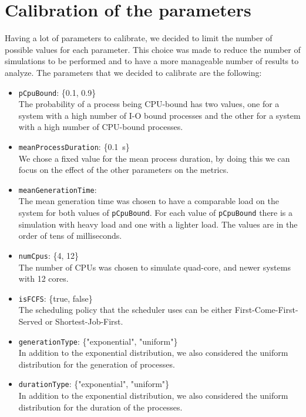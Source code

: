 
\section{Calibration of the parameters}

Having a lot of parameters to calibrate, we decided to limit the number of possible values for each parameter. This choice was made to reduce the number of simulations to be performed and to have a more manageable number of results to analyze. The parameters that we decided to calibrate are the following:

\begin{itemize}
    \item \texttt{pCpuBound}: \{0.1, 0.9\} \\
          The probability of a process being CPU-bound has two values, one for a system with a high number of I-O bound processes and the other for a system with a high number of CPU-bound processes.
    \item \texttt{meanProcessDuration}: \{\SI{0.1}{\second}\} \\
          We chose a fixed value for the mean process duration, by doing this we can focus on the effect of the other parameters on the metrics.
    \item \texttt{meanGenerationTime}:\\
          The mean generation time was chosen to have a comparable load on the system for both values of \texttt{pCpuBound}. For each value of \texttt{pCpuBound} there is a simulation with heavy load and one with a lighter load. The values are in the order of tens of milliseconds.
    \item \texttt{numCpus}: \{4, 12\} \\
          The number of CPUs was chosen to simulate quad-core, and newer systems with 12 cores.
    \item \texttt{isFCFS}: \{true, false\} \\
          The scheduling policy that the scheduler uses can be either First-Come-First-Served or Shortest-Job-First.
    \item \texttt{generationType}: \{"exponential", "uniform"\} \\
          In addition to the exponential distribution, we also considered the uniform distribution for the generation of processes.
    \item \texttt{durationType}: \{"exponential", "uniform"\} \\
          In addition to the exponential distribution, we also considered the uniform distribution for the duration of the processes.
\end{itemize}
